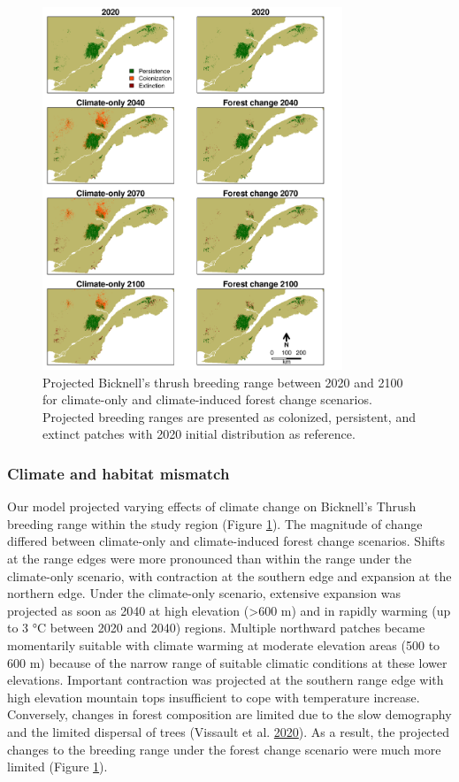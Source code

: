 \documentclass[12pt]{article}
\begin{document}
\begin{figure}
\hypertarget{fig:map_BITH}{%
\centering
\includegraphics[width=0.8\textwidth,height=\textheight]{./manuscript/img/map_BITH.png}
\caption{Projected Bicknell's thrush breeding range between 2020 and
2100 for climate-only and climate-induced forest change scenarios.
Projected breeding ranges are presented as colonized, persistent, and
extinct patches with 2020 initial distribution as
reference.}\label{fig:map_BITH}
}
\end{figure}

\hypertarget{climate-and-habitat-mismatch}{%
\subsubsection{Climate and habitat
mismatch}\label{climate-and-habitat-mismatch}}

Our model projected varying effects of climate change on Bicknell's
Thrush breeding range within the study region (Figure
\ref{fig:map_BITH}). The magnitude of change differed between
climate-only and climate-induced forest change scenarios. Shifts at the
range edges were more pronounced than within the range under the
climate-only scenario, with contraction at the southern edge and
expansion at the northern edge. Under the climate-only scenario,
extensive expansion was projected as soon as 2040 at high elevation
(\textgreater600 m) and in rapidly warming (up to 3 °C between 2020 and
2040) regions. Multiple northward patches became momentarily suitable
with climate warming at moderate elevation areas (500 to 600 m) because
of the narrow range of suitable climatic conditions at these lower
elevations. Important contraction was projected at the southern range
edge with high elevation mountain tops insufficient to cope with
temperature increase. Conversely, changes in forest composition are
limited due to the slow demography and the limited dispersal of trees
(Vissault et al. \protect\hyperlink{ref-vissault_slow_2020}{2020}). As a
result, the projected changes to the breeding range under the forest
change scenario were much more limited (Figure \ref{fig:map_BITH}).
\end{document}
